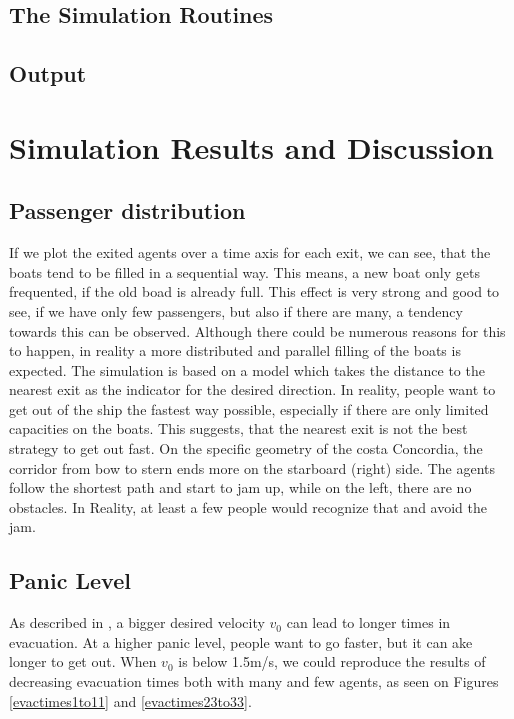 \documentclass[11pt]{article}
\begin{document}
\subsection{The Simulation Routines} %
\label{sub:The simulation Routines}


\subsection{Output} %
\label{sub:Output}

\section{Simulation Results and Discussion}

\subsection{Passenger distribution} %
If we plot the exited agents over a time axis for each exit, we can see, that the boats tend to be filled in a sequential way.
This means, a new boat only gets frequented, if the old boad is already full. This effect is very strong and good to see, if we have only few passengers, but also if there are many, a tendency towards this can be observed.
Although there could be numerous reasons for this to happen, in reality a more distributed and parallel filling of the boats is expected. The simulation is based on a model which takes the distance to the nearest exit as the indicator for the desired direction.
In reality, people want to get out of the ship the fastest way possible, especially if there are only limited capacities on the boats.
This suggests, that the nearest exit is not the best strategy to get out fast.
On the specific geometry of the costa Concordia, the corridor from bow to stern ends more on the starboard (right) side. 
The agents follow the shortest path and start to jam up, while on the left, there are no obstacles.
In Reality, at least a few people would recognize that and avoid the jam.

\subsection{Panic Level} %
As described in \cite{helbing}, a bigger desired velocity \(v_0\) 
can lead to longer times in evacuation.
At a higher panic level, people want to go faster, but it can ake longer to get out.
When \(v_0\) is below 1.5m/s, we could reproduce the results of decreasing evacuation times
both with many and few agents, as seen on Figures \ref{evactimes1to11} and \ref{evactimes23to33}.
\end{document}
